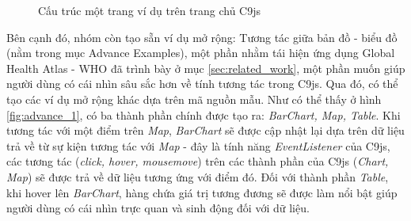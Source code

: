 \documentclass[12pt,a4paper,twoside]{article}
\begin{document}
\begin{figure}[!h]
	\begin{center}
    \caption{Cấu trúc một trang ví dụ trên trang chủ C9js}
    \label{fig:example_page_2}
	\end{center}
\end{figure}

Bên cạnh đó, nhóm còn tạo sẵn ví dụ mở rộng: Tương tác giữa bản đồ - biểu đồ (nằm trong mục Advance Examples), một phần nhằm tái hiện ứng dụng Global Health Atlas - WHO\cite{gha} đã trình bày ở mục \ref{sec:related_work}, một phần muốn giúp người dùng có cái nhìn sâu sắc hơn về tính tương tác trong C9js. Qua đó, có thể tạo các ví dụ mở rộng khác dựa trên mã nguồn mẫu. Như có thể thấy ở hình \ref{fig:advance_1}, có ba thành phần chính được tạo ra: \textit{BarChart, Map, Table}. Khi tương tác với một điểm trên \textit{Map}, \textit{BarChart} sẽ được cập nhật lại dựa trên dữ liệu trả về từ sự kiện tương tác với \textit{Map} - đây là tính năng \textit{EventListener} của C9js, các tương tác (\textit{click, hover, mousemove}) trên các thành phần của C9js (\textit{Chart, Map}) sẽ được trả về dữ liệu tương ứng với điểm đó. Đối với thành phần \textit{Table}, khi hover lên \textit{BarChart}, hàng chứa giá trị tương đương sẽ được làm nổi bật giúp người dùng có cái nhìn trực quan và sinh động đối với dữ liệu.
\end{document}
